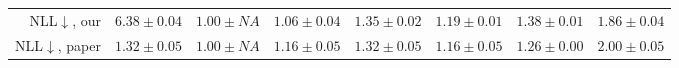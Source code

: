 \begin{table}
\begin{tabular}{r||r|r|r|r|r|r|r}
\hline

NLL$\downarrow$, our &
$6.38 \scriptstyle \pm 0.04$ &
$\mathbf{1.00}\scriptstyle \pm NA$ &
$1.06 \scriptstyle \pm 0.04$ &
$1.35 \scriptstyle \pm 0.02$ &
$1.19 \scriptstyle \pm 0.01$ &
$1.38 \scriptstyle \pm 0.01$ &
$1.86 \scriptstyle \pm 0.04$ \\ 

NLL$\downarrow$, paper &
$1.32 \scriptstyle \pm 0.05$ &
$\mathbf{1.00}\scriptstyle \pm NA$ &
$1.16 \scriptstyle \pm 0.05$ &
$1.32 \scriptstyle \pm 0.05$ &
$1.16 \scriptstyle \pm 0.05$ &
$1.26 \scriptstyle \pm 0.00$ &
$2.00 \scriptstyle \pm 0.05$ \\ 
\hline
\end{tabular}
\\ [1ex] 

\label{tab:classification-measures-norm}
\end{table}




